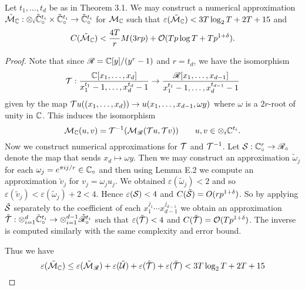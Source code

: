 \begin{proposition}\label{prop:final}
    Let $t_1, \ldots, t_d$ be as in Theorem 3.1. We may construct a numerical approximation $\tilde{\mathcal M}_{\mathbb C}: \otimes_i \tilde{{\mathbb C}}^{t_i}_\circ \times \tilde{{\mathbb C}}^{t_i}_\circ \to \tilde{{\mathbb C}}^{t_i}_\circ$ for $\mathcal M_{\mathbb C}$ such that $\varepsilon(\tilde{\mathcal M}_{\mathbb C}) < 3 T \log_2 T + 2 T + 15$ and
    \[
        C(\tilde{\mathcal M}_{\mathbb C}) < \frac{4T}{r} M(3rp) + \mathcal O(Tp \log T + Tp^{1 + \delta}).
    \]
\end{proposition}

\begin{proof}


    \medskip

    Note that since $\mathscr{R} = {\mathbb C}[y]/(y^{r} - 1)$ and $r = t_d$, we have the isomorphism
    \[
        \mathcal T: \frac{{\mathbb C}[x_1, \ldots, x_d]}{x_1^{t_1} - 1, \ldots, x_d^{t_d} - 1} \to \frac{\mathscr{R}[x_1, \ldots, x_{d-1}]}{x_1^{t_1} - 1, \ldots, x_d^{t_{d-1}} - 1}
    \]
    given by the map $\mathcal Tu((x_1, \ldots, x_d)) \to u(x_1, \ldots, x_{d-1}, \omega y)$ where $\omega$ is a $2r$-root of unity in ${\mathbb C}$. This induces the isomorphism 
    \[
        \mathcal M_{\mathbb C}(u, v) = \mathcal T^{-1}(\mathcal M_{\mathscr{R}}(\mathcal Tu, \mathcal Tv)) \qquad u, v \in \otimes_i {\mathbb C}^{t_i}.
    \]
    Now we construct numerical approximations for $\mathcal T$ and $\mathcal T^{-1}$. Let $\mathcal S: {\mathbb C}^r_\circ \to \mathscr{R}_\circ$ denote the map that sends $x_d \mapsto \omega y$. Then we may construct an approximation $\tilde{\omega}_j$ for each $\omega_j = e^{\pi i j / r} \in {\mathbb C}_\circ$ and then using Lemma E.2 we compute an approximation $\tilde{v}_j$ for $v_j = \omega_j u_j$. We obtained $\varepsilon(\tilde{\omega}_j) < 2$ and so $\varepsilon(\tilde{v}_j) < \varepsilon(\tilde{\omega}_j) + 2 < 4$. Hence $\varepsilon(\mathcal S) < 4$ and $C(\tilde{\mathcal S}) = O(r p^{1 + \delta})$. So by applying $\tilde{\mathcal S}$ separately to the coefficient of each $x_1^{j_1} \cdots x_{d-1}^{j_{d-1}}$ we obtain an approximation $\tilde{\mathcal T}: \otimes_{i=1}^d \tilde{{\mathbb C}}^{t_i}_\circ \to \otimes^{d-1}_{i=1} \tilde{\mathscr{R}}_\circ^{t_i}$ such that $\varepsilon(\tilde{\mathcal T}) < 4$ and $C(\tilde{\mathcal T}) = \mathcal O(Tp^{1 + \delta})$. The inverse is computed similarly with the same complexity and error bound.

    Thus we have
    \[
        \varepsilon(\tilde{\mathcal M}_{\mathbb C}) \le \varepsilon(\tilde{\mathcal M}_{\mathscr{R}}) + \varepsilon(\tilde{\mathcal U}) + \varepsilon(\tilde{\mathcal T}) + \varepsilon(\tilde{\mathcal T}) < 3T \log_2 T + 2T + 15
    \]
\end{proof}

